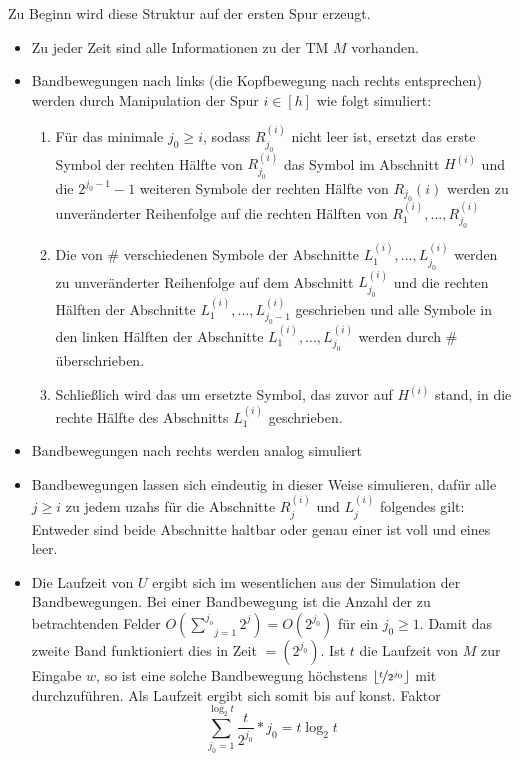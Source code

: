 \begin{satz}{}
    
    Zu Beginn wird diese Struktur auf der ersten Spur erzeugt.
    
    \begin{itemize}
        \item Zu jeder Zeit sind alle Informationen zu der TM $M$ vorhanden.
        \item Bandbewegungen nach links (die Kopfbewegung nach rechts entsprechen) werden durch Manipulation der Spur $i \in [h]$ wie folgt simuliert:
        \begin{enumerate}
            \item Für das minimale $j_0 \geq i$, sodass $R_{j_0}^{(i)}$ nicht leer ist, ersetzt das erste Symbol der rechten Hälfte von $R_{j_0}^(i)$ das Symbol im Abschnitt $H^{(i)}$ und die $2^{j_0-1}-1$ weiteren Symbole der rechten Hälfte von $R_{j_0}{(i)}$ werden zu unveränderter Reihenfolge auf die rechten Hälften von $R_1^{(i)}, ..., R_{j_0}^{(i)}$
            \item Die von $\#$ verschiedenen Symbole der Abschnitte $L_1^{(i)}, ..., L_{j_0}^{(i)}$ werden zu unveränderter Reihenfolge auf dem Abschnitt $L_{j_0}^{(i)}$ und die rechten Hälften der Abschnitte $L_1^{(i)}, ..., L_{j_0 - 1}^{(i)}$ geschrieben und alle Symbole in den linken Hälften der Abschnitte $L_1^{(i)}, ..., L_{j_0}^{(i)}$ werden durch $\#$ überschrieben.
            \item Schließlich wird das um ersetzte Symbol, das zuvor auf $H^{(i)}$ stand, in die rechte Hälfte des Abschnitts $L_1^{(i)}$ geschrieben.
        \end{enumerate}
        
        
        
        \item Bandbewegungen nach rechts werden analog simuliert
        \item Bandbewegungen lassen sich eindeutig in dieser Weise simulieren, dafür alle $j \geq i$ zu jedem uzahs für die Abschnitte $R_j^{(i)}$ und $L_j^{(i)}$ folgendes gilt: Entweder sind beide Abschnitte haltbar oder genau einer ist voll und eines leer.
        \item Die Laufzeit von $U$ ergibt sich im wesentlichen aus der Simulation der Bandbewegungen. Bei einer Bandbewegung ist die Anzahl der zu betrachtenden Felder $O(\underset{j=1}{\overset{j_o}{\sum}} 2^j) = O(2^{j_0})$ für ein $j_0 \geq 1$. Damit das zweite Band funktioniert dies in Zeit $=(2^{j_0})$. Ist $t$ die Laufzeit von $M$ zur Eingabe $w$, so ist eine solche Bandbewegung höchstens $\lfloor \nicefrac{t}{2^{j_0}} \rfloor$ mit durchzuführen. Als Laufzeit ergibt sich somit bis auf konst. Faktor
        $$\underset{j_0 = 1}{\overset{\log_2 t}{\sum}} \frac{t}{2^{j_0}} * j_0 = t \log_2 t $$
    \end{itemize}
\end{satz}
